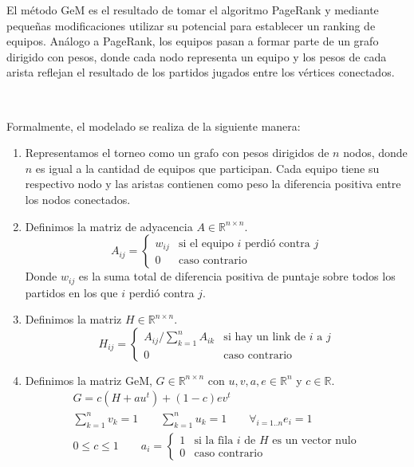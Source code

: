 El método GeM es el resultado de tomar el algoritmo PageRank y mediante pequeñas
modificaciones utilizar su potencial para establecer un ranking de equipos.
Análogo a PageRank, los equipos pasan a formar parte de un grafo dirigido
con pesos, donde cada nodo representa un equipo y los pesos de cada arista
reflejan el resultado de los partidos jugados entre los vértices conectados.

~

Formalmente, el modelado se realiza de la siguiente manera:
\begin{enumerate}
	\item Representamos el torneo como un grafo con pesos dirigidos de $n$
	nodos, donde $n$ es igual a la cantidad de equipos que participan. Cada
	equipo tiene su respectivo nodo y las aristas contienen como peso la
	diferencia positiva entre los nodos conectados.

	\item Definimos la matriz de adyacencia $A \in \mathbb{R}^{n \times n}$.
		\begin{equation*}
			A_{ij} =
				\begin{cases}
					w_{ij} & \text{si el equipo $i$ perdió contra $j$}\\
					0 & \text{caso contrario}
				\end{cases}
		\end{equation*}
		Donde $w_{ij}$ es la suma total de diferencia positiva de puntaje sobre todos
		los partidos en los que $i$ perdió contra $j$.

	\item Definimos la matriz $H \in \mathbb{R}^{n \times n}$.
		\begin{equation*}
			H_{ij} =
				\begin{cases}
					A_{ij}/\sum_{k = 1}^{n}A_{ik} & \text{si hay un link de $i$ a $j$}\\
					0 & \text{caso contrario}
				\end{cases}
		\end{equation*}

	\item Definimos la matriz GeM, $G \in \mathbb{R}^{n \times n}$ con $u, v, a, e \in \mathbb{R}^n$ y $c \in \mathbb{R}$.
		\begin{gather*}
			G = c(H + au^{t}) + (1 - c)ev^{t} \\
			\sum_{k = 1}^{n}v_{k} = 1 \qquad \sum_{k = 1}^{n}u_{k} = 1 \qquad \forall_{i = 1..n} e_{i} = 1 \\
			0 \leq c \leq 1 \qquad
			a_{i} =
			\begin{cases}
				1 & \text{si la fila $i$ de $H$ es un vector nulo} \\
				0 & \text{caso contrario}
			\end{cases}
		\end{gather*}


\end{enumerate}
